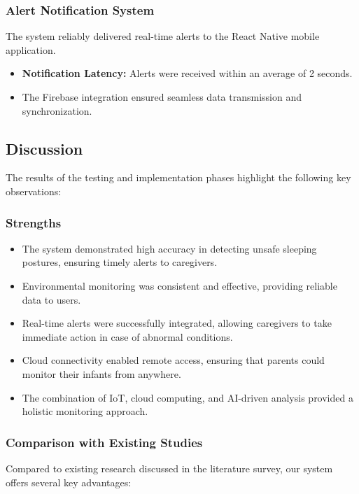 \documentclass[conference]{IEEEtran}
\begin{document}
\subsubsection{Alert Notification System}
The system reliably delivered real-time alerts to the React Native mobile application.
\begin{itemize}
    \item \textbf{Notification Latency:} Alerts were received within an average of 2 seconds.
    \item The Firebase integration ensured seamless data transmission and synchronization.
\end{itemize}


\subsection{Discussion}
The results of the testing and implementation phases highlight the following key observations:

\subsubsection{Strengths}
\begin{itemize}
    \item The system demonstrated high accuracy in detecting unsafe sleeping postures, ensuring timely alerts to caregivers.
    \item Environmental monitoring was consistent and effective, providing reliable data to users.
    \item Real-time alerts were successfully integrated, allowing caregivers to take immediate action in case of abnormal conditions.
    \item Cloud connectivity enabled remote access, ensuring that parents could monitor their infants from anywhere.
    \item The combination of IoT, cloud computing, and AI-driven analysis provided a holistic monitoring approach.
\end{itemize}

\subsubsection{Comparison with Existing Studies}
Compared to existing research discussed in the literature survey, our system offers several key advantages:
\end{document}
